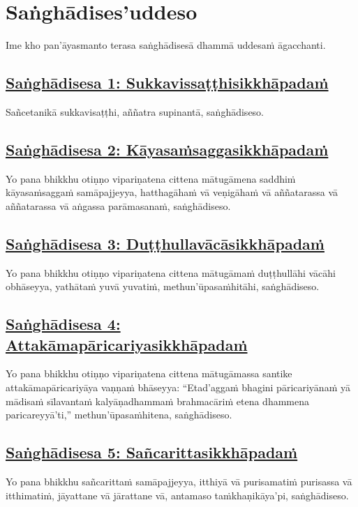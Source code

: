 \setsecheadstyle{\sectionFmt}
\section{Saṅghādises'uddeso}
\label{sd}

\begin{intro}
  Ime kho pan'āyasmanto terasa saṅghādisesā dhammā uddesaṁ āgacchanti.
\end{intro}

\subsection*{\hyperref[comm1]{Saṅghādisesa 1: Sukkavissaṭṭhisikkhāpadaṁ}}
\label{sd1}
Sañcetanikā sukkavisaṭṭhi, aññatra supinantā, saṅghādiseso.

\subsection*{\hyperref[comm2]{Saṅghādisesa 2: Kāyasaṁsaggasikkhāpadaṁ}}
\label{sd2}
Yo pana bhikkhu otiṇṇo vipariṇatena cittena mātugāmena saddhiṁ kāyasaṁsaggaṁ samāpajjeyya, hatthagāhaṁ vā veṇigāhaṁ vā aññatarassa vā aññatarassa vā aṅgassa parāmasanaṁ, saṅghādiseso.

\subsection*{\hyperref[comm3]{Saṅghādisesa 3: Duṭṭhullavācāsikkhāpadaṁ}}
\label{sd3}
Yo pana bhikkhu otiṇṇo vipariṇatena cittena mātugāmaṁ duṭṭhullāhi vācāhi obhāseyya, yathātaṁ yuvā yuvatiṁ, methun'ūpasaṁhitāhi, saṅghādiseso.

\subsection*{\hyperref[comm4]{Saṅghādisesa 4: Attakāmapāricariyasikkhāpadaṁ}}
\label{sd4}
Yo pana bhikkhu otiṇṇo vipariṇatena cittena mātugāmassa santike attakāmapāricariyāya vaṇṇaṁ bhāseyya: ``Etad'aggaṁ bhagini pāricariyānaṁ yā mādisaṁ sīlavantaṁ kalyāṇadhammaṁ brahmacāriṁ etena dhammena paricareyyā'ti,'' methun'ūpasaṁhitena, saṅghādiseso.

\subsection*{\hyperref[comm5]{Saṅghādisesa 5: Sañcarittasikkhāpadaṁ}}
\label{sd5}
Yo pana bhikkhu sañcarittaṁ samāpajjeyya, itthiyā vā purisamatiṁ purisassa vā itthimatiṁ, jāyattane vā jārattane vā, antamaso taṁkhaṇikāya'pi, saṅghādiseso.

